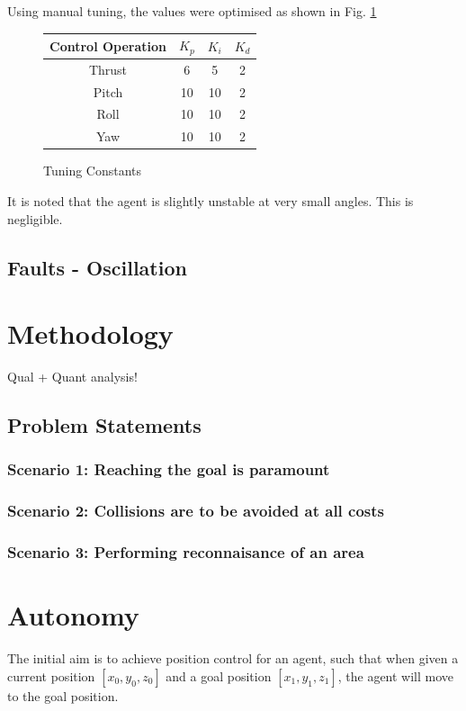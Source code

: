 \documentclass{article}
\begin{document}
Using manual tuning, the values were optimised as shown in Fig. \ref{fig:pid-tuning}

\begin{figure}[H]
    \centering
        \begin{tabular}{| c | c | c | c |} 
        \hline
        Control Operation & $K_p$ & $K_i$ & $K_d$ \\ 
        \hline
        Thrust & 6 & 5 & 2 \\
        \hline
        Pitch & 10 & 10 & 2 \\
        \hline
        Roll & 10 & 10 & 2 \\
        \hline
        Yaw & 10 & 10 & 2 \\
        \hline
        \end{tabular}
        \caption{Tuning Constants}
        \label{fig:pid-tuning}
\end{figure}

It is noted that the agent is slightly unstable at very small angles. This is negligible.

\subsection{Faults - Oscillation}

\section{Methodology}
Qual + Quant analysis!
\subsection{Problem Statements}
\subsubsection{Scenario 1: Reaching the goal is paramount}

\subsubsection{Scenario 2: Collisions are to be avoided at all costs}

\subsubsection{Scenario 3: Performing reconnaisance of an area}

\section{Autonomy}
The initial aim is to achieve position control for an agent, such that when given a current position $[x_0,y_0,z_0]$ and a goal position $[x_1,y_1,z_1]$, the agent will move to the goal position.
\end{document}
